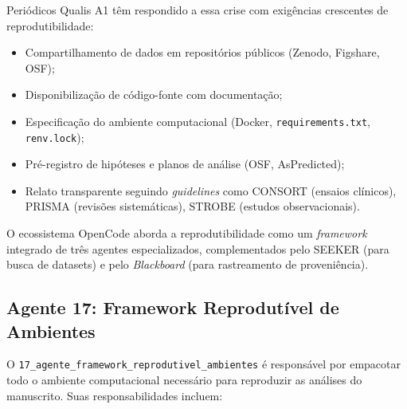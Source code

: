 Periódicos Qualis A1 têm respondido a essa crise com exigências
crescentes de reprodutibilidade:

\begin{itemize}
    \item Compartilhamento de dados em repositórios públicos
    (Zenodo, Figshare, OSF);

    \item Disponibilização de código-fonte com documentação;

    \item Especificação do ambiente computacional (Docker,
    \texttt{requirements.txt}, \texttt{renv.lock});

    \item Pré-registro de hipóteses e planos de análise (OSF,
    AsPredicted);

    \item Relato transparente seguindo \textit{guidelines} como
    CONSORT (ensaios clínicos), PRISMA (revisões sistemáticas),
    STROBE (estudos observacionais).
\end{itemize}

O ecossistema OpenCode aborda a reprodutibilidade como um
\textit{framework} integrado de três agentes especializados,
complementados pelo SEEKER (para busca de datasets) e pelo
\textit{Blackboard} (para rastreamento de proveniência).

\subsection{Agente 17: Framework Reprodutível de Ambientes}
\label{sec:agente17}

O \texttt{17\_agente\_framework\_reprodutivel\_ambientes} é
responsável por empacotar todo o ambiente computacional necessário
para reproduzir as análises do manuscrito. Suas responsabilidades
incluem:

